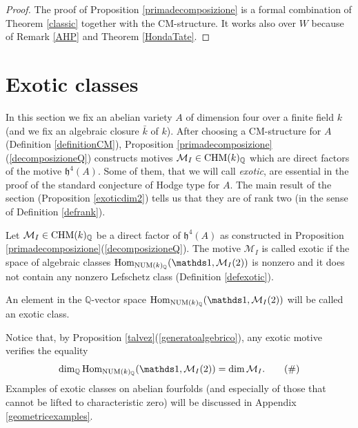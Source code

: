 \documentclass[11pt]{amsart}
\begin{document}


\begin{proof}
The proof of Proposition \ref{primadecomposizione}    is a formal combination of Theorem \ref{classic} together with   the CM-structure.
It works also over $W$ because of Remark \ref{AHP} and Theorem \ref{HondaTate}.
\end{proof}



\section{Exotic classes}\label{sectionexotic}
In this section we fix an abelian variety $A$  of dimension four over a finite field $k$ (and we fix an algebraic closure $\bar{k}$ of $k$). After choosing a CM-structure for $A$ (Definition \ref{definitionCM}), Proposition \ref{primadecomposizione}(\ref{decomposizioneQ}) constructs motives ${\mathcal{M}_I \in \mathrm{CHM} (k)_{\mathbb{Q}}}$ which are direct factors of the motive  $\mathfrak{h}^{4}(A)$. Some of them, that we will call \textit{exotic}, are essential in the proof of the standard conjecture of Hodge type for $A$. The main result of the section (Proposition \ref{exoticdim2}) tells us that they are of rank two (in the sense of Definition \ref{defrank}).
\begin{definition}\label{definizione}
Let  $\mathcal{M}_I \in \mathrm{CHM} (k)_{\mathbb{Q}}$ be a  direct factor of $\mathfrak{h}^{4}(A)$ as constructed in Proposition \ref{primadecomposizione}(\ref{decomposizioneQ}). The motive $\mathcal{M}_I $  is called exotic if the  space of algebraic classes $\Hom_{\NUM(k)_\Q}(\one, \mathcal{M}_I (2))$ is nonzero and it does not contain any  nonzero Lefschetz class (Definition \ref{defexotic}).

An element in the $\mathbb{Q}$-vector space $\Hom_{\NUM(k)_\Q}(\one, \mathcal{M}_I (2))$ will be called an exotic class.
\end{definition}
\begin{remark}\label{remarkuguale}
Notice that, by Proposition \ref{talvez}(\ref{generatoalgebrico}), any exotic motive verifies the equality 
\begin{equation} \label{eq:uguale}
\dim_\Q \Hom_{\NUM(k)_\Q}(\one, \mathcal{M}_I (2)) = \dim \mathcal{M}_I.
 \tag{$\#$}
\end{equation}
Examples of exotic classes on abelian fourfolds (and especially of those that cannot be lifted to characteristic zero) will be discussed in  Appendix \ref{geometricexamples}.
\end{remark}
\end{document}
